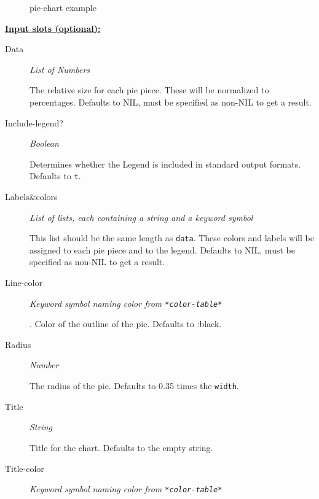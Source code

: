 \documentclass [11pt]{book}
\begin{document}
\begin{itemize}
\begin{figure}
\caption{pie-chart example}

\label{fig:pie-chart}

\end{figure}





\textbf{
\underline{Input slots (optional):}}

\begin{description}

\item [Data]
\emph{List of Numbers}

 The relative size for each pie piece. These will be normalized to percentages.
Defaults to NIL, must be specified as non-NIL to get a result.




\item [Include-legend?]
\emph{Boolean}

 Determines whether the Legend is included in standard output formats. Defaults to \texttt{t}.




\item [Labels&colors]
\emph{List of lists, each containing a string and a keyword symbol}

 This list should be the same
length as \texttt{data}. These colors and labels will be assigned to each pie piece and to the legend.
Defaults to NIL, must be specified as non-NIL to get a result.




\item [Line-color]
\emph{Keyword symbol naming color from \texttt{*color-table*}}

.
Color of the outline of the pie. Defaults to :black.




\item [Radius]
\emph{Number}

 The radius of the pie. Defaults to 0.35 times the \texttt{width}.




\item [Title]
\emph{String}

 Title for the chart. Defaults to the empty string.




\item [Title-color]
\emph{Keyword symbol naming color from \texttt{*color-table*}}


\end{description}
\end{itemize}
\end{document}
